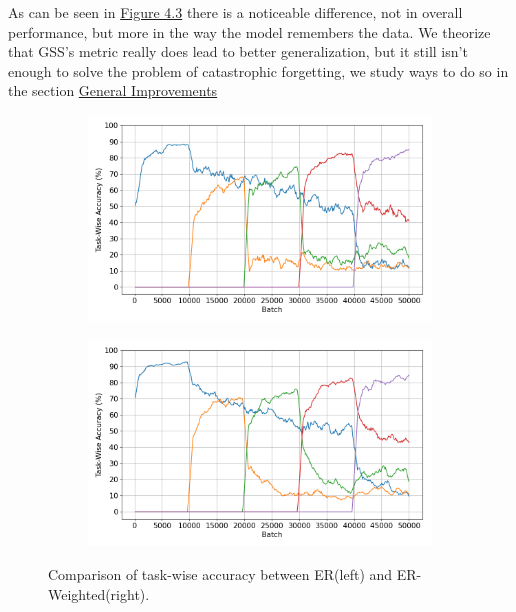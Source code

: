 \documentclass[oneside]{ctuthesis}
\begin{document}
As can be seen in \hyperref[fig:reservoir-grad-angle]{Figure 4.3} there is a noticeable difference, not in overall performance, but more in the way the model remembers the data. We theorize that GSS's metric really does lead to better generalization, but it still isn't enough to solve the problem of catastrophic forgetting, we study ways to do so in the section \hyperref[sec:exptwo]{General Improvements}

\begin{figure}[t]
    \centering
    \begin{subfigure}[t]{0.48\linewidth}
        \centering
        \includegraphics[width=\linewidth]{figures/CIFAR10_DISJOINT_RESERVOIR_accuracy.png}
        \label{fig:gss-fill-0}
    \end{subfigure}
    \hfill
    \begin{subfigure}[t]{0.48\linewidth}
        \centering
        \includegraphics[width=\linewidth]{figures/CIFAR10_DISJOINT_RESERVOIR_GRAD_ANGLE_accuracy.png}
        \label{fig:gss-fill-0.3}
    \end{subfigure}

    \caption{Comparison of task-wise accuracy between ER(left) and ER-Weighted(right).}
    \label{fig:reservoir-grad-angle}
\end{figure}
\end{document}

